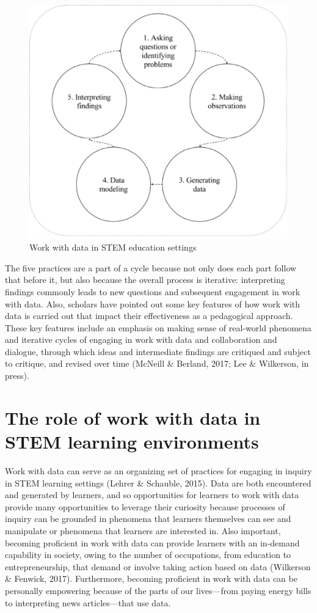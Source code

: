 \documentclass[]{msu-thesis}
\theoremstyle{definition}
\theoremstyle{definition}
\theoremstyle{definition}
\theoremstyle{remark}
\begin{document}
\begin{figure}

{\centering \includegraphics[width=0.8\linewidth]{images/figure1} 

}

\caption{Work with data in STEM education settings}\label{fig:unnamed-chunk-1}
\end{figure}

The five practices are a part of a cycle because not only does each part
follow that before it, but also because the overall process is
iterative: interpreting findings commonly leads to new questions and
subsequent engagement in work with data. Also, scholars have pointed out
some key features of how work with data is carried out that impact their
effectiveness as a pedagogical approach. These key features include an
emphasis on making sense of real-world phenomena and iterative cycles of
engaging in work with data and collaboration and dialogue, through which
ideas and intermediate findings are critiqued and subject to critique,
and revised over time (McNeill \& Berland, 2017; Lee \& Wilkerson, in
press).

\section{The role of work with data in STEM learning
environments}\label{the-role-of-work-with-data-in-stem-learning-environments}

Work with data can serve as an organizing set of practices for engaging
in inquiry in STEM learning settings (Lehrer \& Schauble, 2015). Data
are both encountered and generated by learners, and so opportunities for
learners to work with data provide many opportunities to leverage their
curiosity because processes of inquiry can be grounded in phenomena that
learners themselves can see and manipulate or phenomena that learners
are interested in. Also important, becoming proficient in work with data
can provide learners with an in-demand capability in society, owing to
the number of occupations, from education to entrepreneurship, that
demand or involve taking action based on data (Wilkerson \& Fenwick,
2017). Furthermore, becoming proficient in work with data can be
personally empowering because of the parts of our lives---from paying
energy bills to interpreting news articles---that use data.
\end{document}
